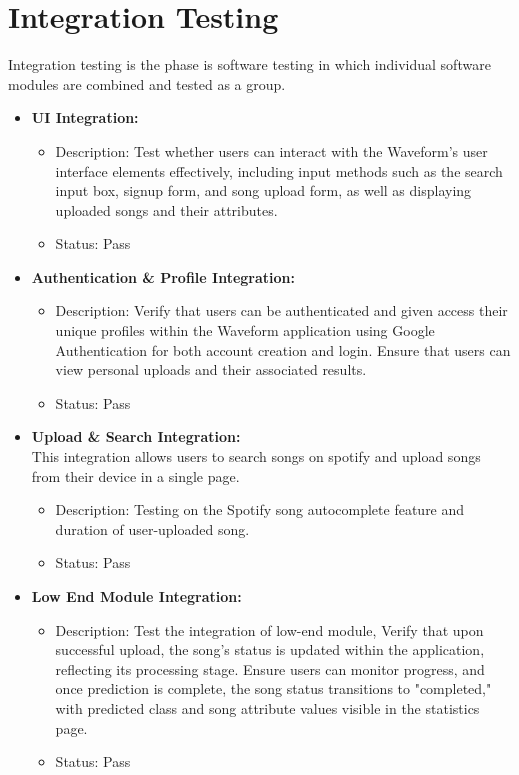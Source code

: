 \documentclass[11pt]{report}
\begin{document}
 \section{Integration Testing}
  Integration testing is the phase is software testing in which individual software modules are combined and tested as a group.
 \begin{itemize}
   \item \textbf{UI Integration:}
    \begin{itemize}
        \item Description: Test whether users can interact with the Waveform's user interface elements effectively, including input methods such as the search input box, signup form, and song upload form, as well as displaying uploaded songs and their attributes.
        \item Status: Pass
    \end{itemize}
\item \textbf{Authentication \& Profile Integration:}
    \begin{itemize}
        \item Description: Verify that users can be  authenticated and  given access their unique profiles within the Waveform application using Google Authentication for both account creation and login. Ensure that users can view personal uploads and their associated results.
        \item Status: Pass
    \end{itemize}
       
     \item \textbf{Upload \& Search Integration: }\\
     This integration allows users to search songs on spotify and upload songs from their device in a single page.
     \begin{itemize}
    \item Description: Testing on the Spotify song autocomplete feature and duration of user-uploaded song.
    \item Status: Pass
    \end{itemize}
     
      \item \textbf{Low End Module Integration:}
    \begin{itemize}
        \item Description: Test the integration of low-end module, Verify that upon successful upload, the song's status is updated within the application, reflecting its processing stage. Ensure users can monitor progress, and once prediction is complete, the song status transitions to "completed," with predicted class and song attribute values visible in the statistics page.
        \item Status: Pass
    \end{itemize}


\end{itemize}
\end{document}
